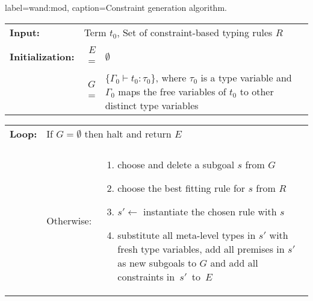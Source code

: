 \begin{taplfigureT}{label=wand:mod, caption={Constraint generation algorithm.}}

\quad
\setlength{\tabcolsep}{2pt}
\begin{tabular}{l r p{7cm}}
\textbf{Input:}          & \multicolumn{2}{l}{Term $t_0$, Set
                           of constraint-based typing rules $R$} \\
                         & & \\
                         
\textbf{Initialization:} & $E$ = & $\emptyset$ \\
                         & $G$ = & $\{ \Gamma_0 \vdash t_0 : \tau_0 \}$,
                                   where $\tau_0$ is a type variable and $\Gamma_0$
                                   maps the free variables of $t_0$ to other distinct
                                   type variables \\
\end{tabular}

\quad
\setlength{\tabcolsep}{1pt}
\begin{tabular}{l l p{7.5cm}}
\textbf{Loop:}
\quad\quad\quad	& \multicolumn{2}{l}{If $G = \emptyset$ then halt and return $E$} \\
                &            & \\
                & Otherwise: & \vspace{-16pt}
                               \begin{enumerate}
                                \item choose and delete a
                                      subgoal $s$ from $G$
                                \item choose the best fitting
                                      rule for $s$ from $R$
                                \item $s' \leftarrow$ instantiate
                                      the chosen rule with $s$
                                \item substitute all meta-level
                                      types in $s'$ with fresh type
                                      variables, add all premises in
                                      $s'$ as new subgoals to $G$ and
                                      add all constraints \mbox{in
                                        $s'$ to $E$}
                               \end{enumerate} \\
\end{tabular}
\vspace{-1.5em}
\end{taplfigureT}